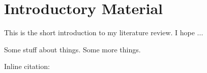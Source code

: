 \chapter{Introductory Material}
\label{introduction}

This is the short introduction to my literature review. I hope ...

Some stuff about things. \cite{example-citation} Some more things. 

Inline citation: 

\blindtext
